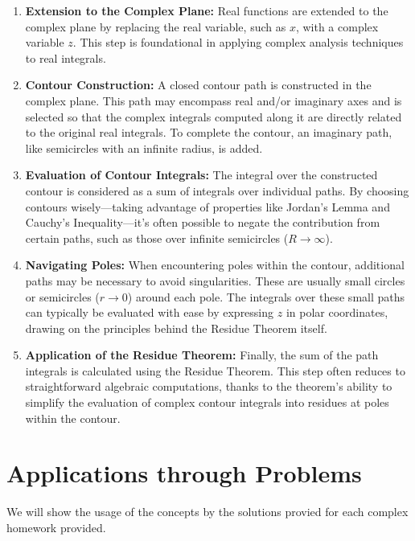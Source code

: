 \documentclass[12pt]{article}
\begin{document}
\begin{enumerate}
    \item \textbf{Extension to the Complex Plane:} Real functions are extended to the complex plane by replacing the real variable, such as \(x\), with a complex variable \(z\). This step is foundational in applying complex analysis techniques to real integrals.
    
    \item \textbf{Contour Construction:} A closed contour path is constructed in the complex plane. This path may encompass real and/or imaginary axes and is selected so that the complex integrals computed along it are directly related to the original real integrals. To complete the contour, an imaginary path, like semicircles with an infinite radius, is added. 
    
    \item \textbf{Evaluation of Contour Integrals:} The integral over the constructed contour is considered as a sum of integrals over individual paths. By choosing contours wisely—taking advantage of properties like Jordan's Lemma and Cauchy's Inequality—it's often possible to negate the contribution from certain paths, such as those over infinite semicircles (\(R \rightarrow \infty\)).
    
    \item \textbf{Navigating Poles:} When encountering poles within the contour, additional paths may be necessary to avoid singularities. These are usually small circles or semicircles (\(r \rightarrow 0\)) around each pole. The integrals over these small paths can typically be evaluated with ease by expressing \(z\) in polar coordinates, drawing on the principles behind the Residue Theorem itself.
    
    \item \textbf{Application of the Residue Theorem:} Finally, the sum of the path integrals is calculated using the Residue Theorem. This step often reduces to straightforward algebraic computations, thanks to the theorem's ability to simplify the evaluation of complex contour integrals into residues at poles within the contour.
\end{enumerate}



\section{Applications through Problems}
We will show the usage of the concepts by the solutions provied for each complex homework provided.
\end{document}
